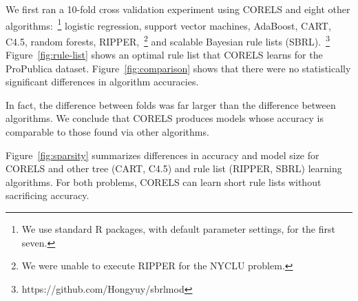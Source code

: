 We first ran a 10-fold cross validation experiment using CORELS and eight other
algorithms:~\footnote{We use standard R packages, with default parameter settings, for the first seven.}
logistic regression, support vector machines, AdaBoost, CART, C4.5, random forests, RIPPER,~\footnote{We were unable to execute RIPPER for the NYCLU problem.} and scalable Bayesian rule lists (SBRL).~\footnote{https://github.com/Hongyuy/sbrlmod}
%
Figure~\ref{fig:rule-list} shows an  optimal rule list that CORELS learns
for the ProPublica dataset.
%
Figure~\ref{fig:comparison} shows that there were no statistically significant
differences in algorithm accuracies.
\begin{arxiv}
In fact, the difference between folds was far larger than the difference
between algorithms.
We conclude that CORELS produces models whose accuracy is comparable
to those found via other algorithms.

\end{arxiv}
%
Figure~\ref{fig:sparsity} summarizes differences in accuracy and model size
for CORELS and other tree (CART, C4.5) and rule list (RIPPER, SBRL) learning algorithms.
%
For both problems, CORELS can learn short rule lists without sacrificing accuracy.

